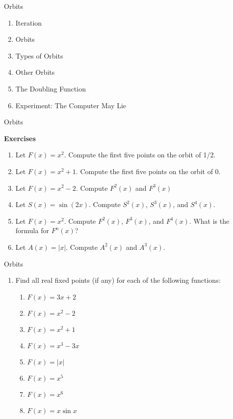\begin{frame}{Orbits}

\begin{enumerate}
\item Iteration
\item Orbits
\item Types of Orbits
\item Other Orbits
\item The Doubling Function
\item Experiment: The Computer May Lie
\end{enumerate}

\end{frame}


\begin{frame}{Orbits}


\textbf{Exercises}

\begin{enumerate}

\item Let $F(x) = x^2$. Compute the first five points on the orbit of 1/2.
\item Let $F(x) = x^2 + 1$. Compute the first five points on the orbit of 0.
\item Let $F(x) = x^2 - 2$. Compute $F^2(x)$ and $F^3(x)$
\item Let $S(x) = \sin(2x)$. Compute $S^2(x)$, $S^3(x)$, and $S^4(x)$.
\item Let $F(x) = x^2$. Compute $F^2(x)$, $F^3 (x)$, and $F^4(x)$. What is the formula for $F^n(x)$?
\item Let $A(x) = |x|$. Compute $A^2(x)$ and $A^3(x)$.
\end{enumerate}

\end{frame}


\begin{frame}{Orbits}


\begin{enumerate}

\item Find all real fixed points (if any) for each of the following functions:

 \begin{enumerate}
  \item $F(x) = 3x + 2$
  \item $F(x) = x^2 - 2$
  \item $F(x) = x^2 + 1$
  \item $F(x) = x^3 - 3x$
  \item $F(x) = |x|$
  \item $F(x) = x^5$
  \item $F(x) = x^6$
  \item $F (x) = x \sin x$
  \end{enumerate}

\end{enumerate}

\end{frame}


